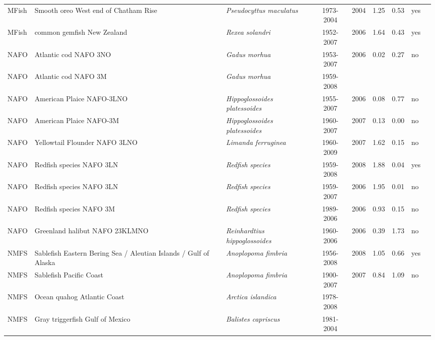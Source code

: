 \begin{longtable}{p{1.8cm}p{4cm}p{4cm}ccccp{1.9cm}c}
  MFish & Smooth oreo West end of Chatham Rise & \textit{Pseudocyttus maculatus} & 1973-2004 & 2004 & 1.25 & 0.53 & yes & \cite{NA} \\ 
  MFish & common gemfish New Zealand & \textit{Rexea solandri} & 1952-2007 & 2006 & 1.64 & 0.43 & yes & \cite{NA} \\ 
  NAFO & Atlantic cod NAFO 3NO & \textit{Gadus morhua} & 1953-2007 & 2006 & 0.02 & 0.27 & no & \cite{NAFO-3NO-COD-2007.pdf} \\ 
  NAFO & Atlantic cod NAFO 3M & \textit{Gadus morhua} & 1959-2008 &  &  &  &  & \cite{NAFO-3M-COD-2008.pdf} \\ 
  NAFO & American Plaice NAFO-3LNO & \textit{Hippoglossoides platessoides} & 1955-2007 & 2006 & 0.08 & 0.77 & no & \cite{NAFO-GrandBanks-AmPlaice-2007.pdf} \\ 
  NAFO & American Plaice NAFO-3M & \textit{Hippoglossoides platessoides} & 1960-2007 & 2007 & 0.13 & 0.00 & no & \cite{NAFO-AMPL3M-2008.pdf} \\ 
  NAFO & Yellowtail Flounder NAFO 3LNO & \textit{Limanda ferruginea} & 1960-2009 & 2007 & 1.62 & 0.15 & no & \cite{NAFO-YELL3LNO-2008.pdf} \\ 
  NAFO & Redfish species NAFO 3LN & \textit{Redfish species} & 1959-2008 & 2008 & 1.88 & 0.04 & yes & \cite{NAFO-3LN-Redfishspp-2008.pdf} \\ 
  NAFO & Redfish species NAFO 3LN & \textit{Redfish species} & 1959-2007 & 2006 & 1.95 & 0.01 & no & \cite{NAFO-RED3LN-2007.pdf} \\ 
  NAFO & Redfish species NAFO 3M & \textit{Redfish species} & 1989-2006 & 2006 & 0.93 & 0.15 & no & \cite{NAFO-RED3M-2007.pdf} \\ 
  NAFO & Greenland halibut NAFO 23KLMNO & \textit{Reinhardtius hippoglossoides} & 1960-2006 & 2006 & 0.39 & 1.73 & no & \cite{NAFO-GHAL23KLMNO-2007.pdf} \\ 
  NMFS & Sablefish Eastern Bering Sea / Aleutian Islands / Gulf of Alaska & \textit{Anoplopoma fimbria} & 1956-2008 & 2008 & 1.05 & 0.66 & yes & \cite{AFSC-SABLEFEBSAIGA-2008-Sablefish EBS AI GA.pdf} \\ 
  NMFS & Sablefish Pacific Coast & \textit{Anoplopoma fimbria} & 1900-2007 & 2007 & 0.84 & 1.09 & no & \cite{NWFSC-SABLEFPCOAST-2007-Sablefish.pdf} \\ 
  NMFS & Ocean quahog Atlantic Coast & \textit{Arctica islandica} & 1978-2008 &  &  &  &  & \cite{quahog.pdf} \\ 
  NMFS & Gray triggerfish Gulf of Mexico & \textit{Balistes capriscus} & 1981-2004 &  &  &  &  & \cite{JENSEN_GTRIGGM_2006.pdf} \\ 

\end{longtable}
